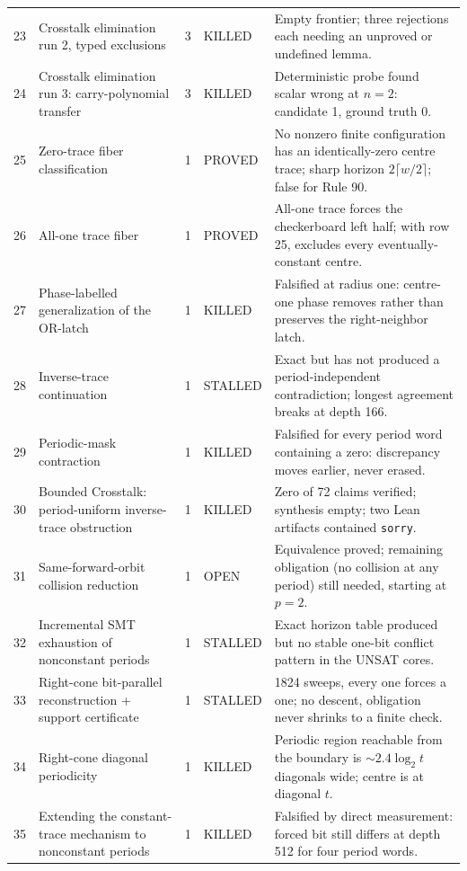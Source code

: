 \documentclass[11pt]{article}
\theoremstyle{definition}
\begin{document}
{\begin{longtable}{@{}r p{4.0cm} c p{1.7cm} p{6.1cm}@{}}
23 & Crosstalk elimination run 2, typed exclusions & 3 & KILLED & Empty frontier; three rejections each needing an unproved or undefined lemma. \\
24 & Crosstalk elimination run 3: carry-polynomial transfer & 3 & KILLED & Deterministic probe found scalar wrong at $n=2$: candidate 1, ground truth 0. \\
25 & Zero-trace fiber classification & 1 & PROVED & No nonzero finite configuration has an identically-zero centre trace; sharp horizon $2\lceil w/2\rceil$; false for Rule 90. \\
26 & All-one trace fiber & 1 & PROVED & All-one trace forces the checkerboard left half; with row 25, excludes every eventually-constant centre. \\
27 & Phase-labelled generalization of the OR-latch & 1 & KILLED & Falsified at radius one: centre-one phase removes rather than preserves the right-neighbor latch. \\
28 & Inverse-trace continuation & 1 & STALLED & Exact but has not produced a period-independent contradiction; longest agreement breaks at depth 166. \\
29 & Periodic-mask contraction & 1 & KILLED & Falsified for every period word containing a zero: discrepancy moves earlier, never erased. \\
30 & Bounded Crosstalk: period-uniform inverse-trace obstruction & 1 & KILLED & Zero of 72 claims verified; synthesis empty; two Lean artifacts contained \texttt{sorry}. \\
31 & Same-forward-orbit collision reduction & 1 & OPEN & Equivalence proved; remaining obligation (no collision at any period) still needed, starting at $p=2$. \\
32 & Incremental SMT exhaustion of nonconstant periods & 1 & STALLED & Exact horizon table produced but no stable one-bit conflict pattern in the UNSAT cores. \\
33 & Right-cone bit-parallel reconstruction + support certificate & 1 & STALLED & 1824 sweeps, every one forces a one; no descent, obligation never shrinks to a finite check. \\
34 & Right-cone diagonal periodicity & 1 & KILLED & Periodic region reachable from the boundary is $\sim2.4\log_2 t$ diagonals wide; centre is at diagonal $t$. \\
35 & Extending the constant-trace mechanism to nonconstant periods & 1 & KILLED & Falsified by direct measurement: forced bit still differs at depth 512 for four period words. \\

\end{longtable}}
\end{document}
